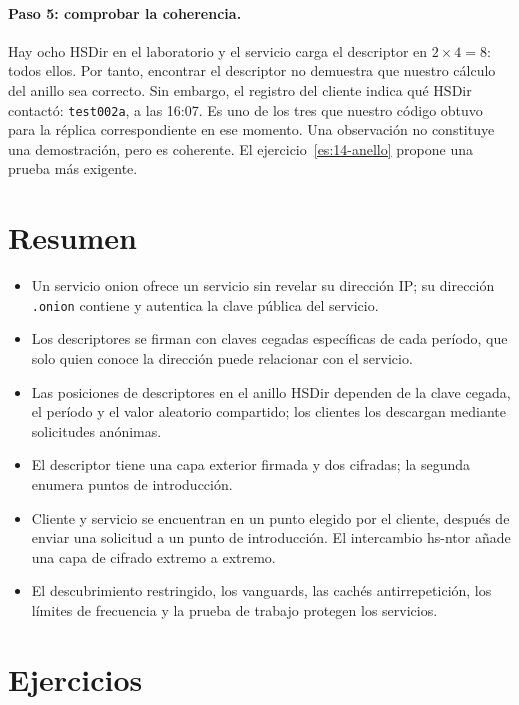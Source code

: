 \paragraph{Paso 5: comprobar la coherencia.} Hay ocho HSDir en el laboratorio y el servicio carga el descriptor en $2\times4=8$: todos ellos. Por tanto, encontrar el descriptor no demuestra que nuestro cálculo del anillo sea correcto. Sin embargo, el registro  del cliente indica qué HSDir contactó: \texttt{test002a}, a las 16:07. Es uno de los tres que nuestro código obtuvo para la réplica correspondiente en ese momento. Una observación no constituye una demostración, pero es coherente. El ejercicio~\ref{es:14-anello} propone una prueba más exigente.

\section*{Resumen}
\begin{itemize}
  \item Un servicio onion ofrece un servicio sin revelar su dirección IP; su dirección \texttt{.onion} contiene y autentica la clave pública del servicio.
  \item Los descriptores se firman con claves cegadas específicas de cada período, que solo quien conoce la dirección puede relacionar con el servicio.
  \item Las posiciones de descriptores en el anillo HSDir dependen de la clave cegada, el período y el valor aleatorio compartido; los clientes los descargan mediante solicitudes anónimas.
  \item El descriptor tiene una capa exterior firmada y dos cifradas; la segunda enumera puntos de introducción.
  \item Cliente y servicio se encuentran en un punto elegido por el cliente, después de enviar una solicitud a un punto de introducción. El intercambio hs-ntor añade una capa de cifrado extremo a extremo.
  \item El descubrimiento restringido, los vanguards, las cachés antirrepetición, los límites de frecuencia y la prueba de trabajo protegen los servicios.
\end{itemize}

\section*{Ejercicios}


